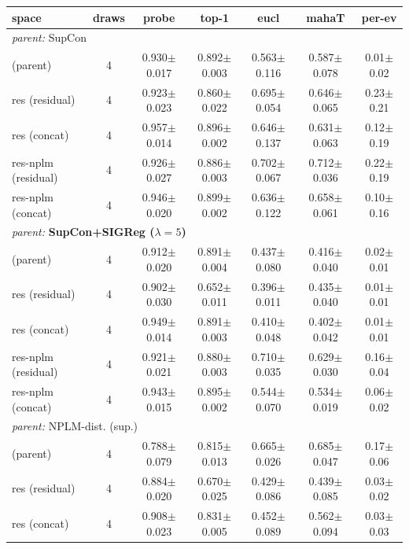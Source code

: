 \begin{table}[t]
\centering
\footnotesize
\begin{tabular}{lcccccc}
\toprule
space & draws & probe & top-1 & eucl & mahaT & per-ev \\
\midrule
\multicolumn{7}{l}{\emph{parent: }SupCon} \\
\quad (parent) & 4 & 0.930$\pm$0.017 & 0.892$\pm$0.003 & 0.563$\pm$0.116 & 0.587$\pm$0.078 & 0.01$\pm$0.02 \\
\quad res (residual) & 4 & 0.923$\pm$0.023 & 0.860$\pm$0.022 & 0.695$\pm$0.054 & 0.646$\pm$0.065 & 0.23$\pm$0.21 \\
\quad res (concat) & 4 & 0.957$\pm$0.014 & 0.896$\pm$0.002 & 0.646$\pm$0.137 & 0.631$\pm$0.063 & 0.12$\pm$0.19 \\
\quad res-nplm (residual) & 4 & 0.926$\pm$0.027 & 0.886$\pm$0.003 & 0.702$\pm$0.067 & 0.712$\pm$0.036 & 0.22$\pm$0.19 \\
\quad res-nplm (concat) & 4 & 0.946$\pm$0.020 & 0.899$\pm$0.002 & 0.636$\pm$0.122 & 0.658$\pm$0.061 & 0.10$\pm$0.16 \\
\multicolumn{7}{l}{\emph{parent: }\textbf{SupCon+SIGReg ($\lambda{=}5$)}} \\
\quad (parent) & 4 & 0.912$\pm$0.020 & 0.891$\pm$0.004 & 0.437$\pm$0.080 & 0.416$\pm$0.040 & 0.02$\pm$0.01 \\
\quad res (residual) & 4 & 0.902$\pm$0.030 & 0.652$\pm$0.011 & 0.396$\pm$0.011 & 0.435$\pm$0.040 & 0.01$\pm$0.01 \\
\quad res (concat) & 4 & 0.949$\pm$0.014 & 0.891$\pm$0.003 & 0.410$\pm$0.048 & 0.402$\pm$0.042 & 0.01$\pm$0.01 \\
\quad res-nplm (residual) & 4 & 0.921$\pm$0.021 & 0.880$\pm$0.003 & 0.710$\pm$0.035 & 0.629$\pm$0.030 & 0.16$\pm$0.04 \\
\quad res-nplm (concat) & 4 & 0.943$\pm$0.015 & 0.895$\pm$0.002 & 0.544$\pm$0.070 & 0.534$\pm$0.019 & 0.06$\pm$0.02 \\
\multicolumn{7}{l}{\emph{parent: }NPLM-dist. (sup.)} \\
\quad (parent) & 4 & 0.788$\pm$0.079 & 0.815$\pm$0.013 & 0.665$\pm$0.026 & 0.685$\pm$0.047 & 0.17$\pm$0.06 \\
\quad res (residual) & 4 & 0.884$\pm$0.020 & 0.670$\pm$0.025 & 0.429$\pm$0.086 & 0.439$\pm$0.085 & 0.03$\pm$0.02 \\
\quad res (concat) & 4 & 0.908$\pm$0.023 & 0.831$\pm$0.005 & 0.452$\pm$0.089 & 0.562$\pm$0.094 & 0.03$\pm$0.03 \\

\end{tabular}
\end{table}
